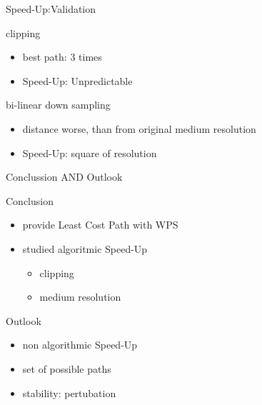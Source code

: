 \documentclass[usenames,dvipsnames,aspectratio=169]{beamer}
\begin{document}
	\begin{frame}{Speed-Up:Validation}
		\begin{minipage}[t]{0.48\textwidth}
			clipping
			\begin{itemize}
				\item best path: 3 times
				\item Speed-Up: Unpredictable
			\end{itemize}
		\end{minipage}
		\hfill	
		\begin{minipage}[t]{0.48\textwidth}
			bi-linear down sampling
			\begin{itemize}
				\item distance worse, than from original medium resolution
				\item Speed-Up: square of resolution
			\end{itemize}
		\end{minipage}
	\end{frame}

	\begin{frame}{Conclussion AND Outlook}

	\begin{minipage}[t]{0.48\textwidth}
		Conclusion
		\begin{itemize}
			\item provide Least Cost Path with WPS
			\item studied algoritmic Speed-Up
			     \begin{itemize}
			     	\item clipping
			     	\item medium resolution
			     \end{itemize}
		\end{itemize}
	\end{minipage}
	\hfill	
	\begin{minipage}[t]{0.48\textwidth}
		Outlook
		\begin{itemize}
			\item non algorithmic Speed-Up
			\item set of possible paths
			\item stability: pertubation
		\end{itemize}
	\end{minipage}
	\end{frame}
\end{document}
